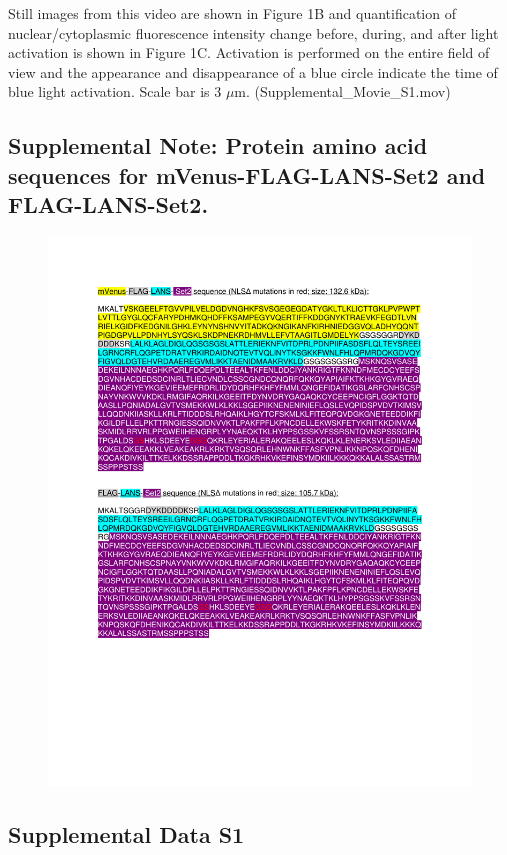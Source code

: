\documentclass[11pt]{biorxiv}
\begin{document}
\noindent Still images from this video are shown in Figure 1B and quantification of nuclear/cytoplasmic fluorescence intensity change before, during, and after light activation is shown in Figure 1C. Activation is performed on the entire field of view and the appearance and disappearance of a blue circle indicate the time of blue light activation. Scale bar is 3 $\mu$m. (Supplemental\_Movie\_S1.mov)

\subsection{Supplemental Note: Protein amino acid sequences for mVenus-FLAG-LANS-Set2 and FLAG-LANS-Set2.}

\begin{figure}[ht!]
\center
\includegraphics[width=\textwidth, trim={0in 2in 0in 1in}, clip]{notes/Supplemental_Note.pdf}
\end{figure}

\subsection{Supplemental Data S1}
\end{document}
